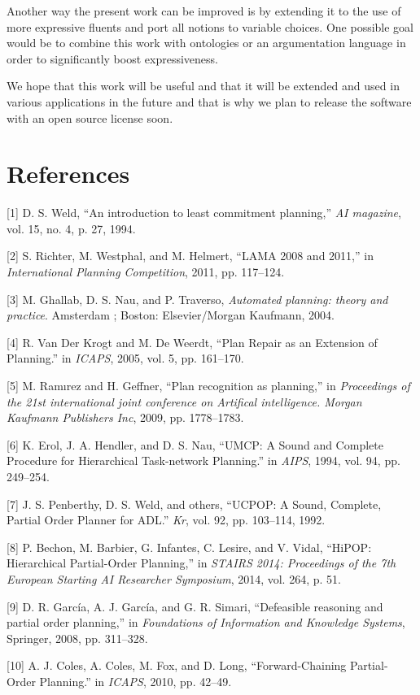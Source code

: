 \documentclass[]{article}
\begin{document}
Another way the present work can be improved is by extending it to the
use of more expressive fluents and port all notions to variable choices.
One possible goal would be to combine this work with ontologies or an
argumentation language in order to significantly boost expressiveness.

We hope that this work will be useful and that it will be extended and
used in various applications in the future and that is why we plan to
release the software with an open source license soon.

\section*{References}\label{references}

\hypertarget{refs}{}
\hypertarget{ref-weldux5fintroductionux5f1994}{}
{[}1{]} D. S. Weld, ``An introduction to least commitment planning,''
\emph{AI magazine}, vol. 15, no. 4, p. 27, 1994.

\hypertarget{ref-richterux5flamaux5f2011}{}
{[}2{]} S. Richter, M. Westphal, and M. Helmert, ``LAMA 2008 and 2011,''
in \emph{International Planning Competition}, 2011, pp. 117--124.

\hypertarget{ref-ghallabux5fautomatedux5f2004}{}
{[}3{]} M. Ghallab, D. S. Nau, and P. Traverso, \emph{Automated
planning: theory and practice}. Amsterdam ; Boston: Elsevier/Morgan
Kaufmann, 2004.

\hypertarget{ref-vanux5fderux5fkrogtux5fplanux5f2005}{}
{[}4{]} R. Van Der Krogt and M. De Weerdt, ``Plan Repair as an Extension
of Planning.'' in \emph{ICAPS}, 2005, vol. 5, pp. 161--170.

\hypertarget{ref-ramirezux5fplanux5f2009}{}
{[}5{]} M. Ramırez and H. Geffner, ``Plan recognition as planning,'' in
\emph{Proceedings of the 21st international joint conference on
Artifical intelligence. Morgan Kaufmann Publishers Inc}, 2009, pp.
1778--1783.

\hypertarget{ref-erolux5fumcp:ux5f1994}{}
{[}6{]} K. Erol, J. A. Hendler, and D. S. Nau, ``UMCP: A Sound and
Complete Procedure for Hierarchical Task-network Planning.'' in
\emph{AIPS}, 1994, vol. 94, pp. 249--254.

\hypertarget{ref-penberthyux5fucpop:ux5f1992}{}
{[}7{]} J. S. Penberthy, D. S. Weld, and others, ``UCPOP: A Sound,
Complete, Partial Order Planner for ADL.'' \emph{Kr}, vol. 92, pp.
103--114, 1992.

\hypertarget{ref-bechonux5fhipop:ux5f2014}{}
{[}8{]} P. Bechon, M. Barbier, G. Infantes, C. Lesire, and V. Vidal,
``HiPOP: Hierarchical Partial-Order Planning,'' in \emph{STAIRS 2014:
Proceedings of the 7th European Starting AI Researcher Symposium}, 2014,
vol. 264, p. 51.

\hypertarget{ref-garciaux5fdefeasibleux5f2008}{}
{[}9{]} D. R. García, A. J. García, and G. R. Simari, ``Defeasible
reasoning and partial order planning,'' in \emph{Foundations of
Information and Knowledge Systems}, Springer, 2008, pp. 311--328.

\hypertarget{ref-colesux5fforward-chainingux5f2010}{}
{[}10{]} A. J. Coles, A. Coles, M. Fox, and D. Long, ``Forward-Chaining
Partial-Order Planning.'' in \emph{ICAPS}, 2010, pp. 42--49.
\end{document}
